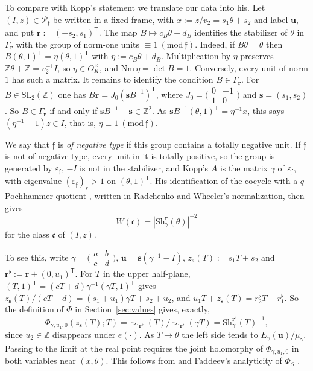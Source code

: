 \documentclass[11pt]{amsart}
\numberwithin{equation}{section}
\theoremstyle{plain}
\theoremstyle{definition}
\theoremstyle{remark}
\begin{document}
To compare with Kopp's statement we translate our data into his. Let $(I,z)\in\mathcal P_{\mathfrak f}$ be written in a fixed frame, with $x:=z/v_2=s_1\theta+s_2$ and label $\mathbf u$, and put $\mathbf r:=(-s_2,s_1)^{\mathsf T}$. The map $B\mapsto c_B\theta+d_B$ identifies the stabilizer of $\theta$ in $\Gamma_{\mathbf r}$ with the group of norm-one units $\equiv1\ (\mathrm{mod}\ \mathfrak f)$. Indeed, if $B\theta=\theta$ then $B(\theta,1)^{\mathsf T}=\eta(\theta,1)^{\mathsf T}$ with $\eta:=c_B\theta+d_B$. Multiplication by $\eta$ preserves $\mathbb Z\theta+\mathbb Z=v_2^{-1}I$, so $\eta\in O_K^\times$, and $\mathrm{Nm}\,\eta=\det B=1$. Conversely, every unit of norm $1$ has such a matrix. It remains to identify the condition $B\in\Gamma_{\mathbf r}$. For $B\in\mathrm{SL}_2(\mathbb Z)$ one has $B\mathbf r=J_0(\mathbf sB^{-1})^{\mathsf T}$, where $J_0=\bigl(\begin{smallmatrix}0&-1\\1&0\end{smallmatrix}\bigr)$ and $\mathbf s=(s_1,s_2)$. So $B\in\Gamma_{\mathbf r}$ if and only if $\mathbf sB^{-1}-\mathbf s\in\mathbb Z^2$. As $\mathbf sB^{-1}(\theta,1)^{\mathsf T}=\eta^{-1}x$, this says $(\eta^{-1}-1)z\in I$, that is, $\eta\equiv1\ (\mathrm{mod}\ \mathfrak f)$.

We say that $\mathfrak f$ is \emph{of negative type} if this group contains a totally negative unit. If $\mathfrak f$ is not of negative type, every unit in it is totally positive, so the group is generated by $\varepsilon_{\mathfrak f}$, $-I$ is not in the stabilizer, and Kopp's $A$ is the matrix $\gamma$ of $\varepsilon_{\mathfrak f}$, with eigenvalue $(\varepsilon_{\mathfrak f})_r>1$ on $(\theta,1)^{\mathsf T}$. His identification of the cocycle with a $q$-Pochhammer quotient \cite[Lemma~4.14, Props.~4.19, 4.35, 4.39]{Ko}, written in Radchenko and Wheeler's normalization, then gives
\begin{equation}\label{eq:koppW}
W(\mathfrak c)=|\mathrm{Sh}^{\mathbf r}_\gamma(\theta)|^{-2}
\end{equation}
for the class $\mathfrak c$ of $(I,z)$.

To see this, write $\gamma=\bigl(\begin{smallmatrix}a&b\\c&d\end{smallmatrix}\bigr)$, $\mathbf u=\mathbf s(\gamma^{-1}-I)$, $z_{\mathbf s}(T):=s_1T+s_2$ and $\mathbf r^\flat:=\mathbf r+(0,u_1)^{\mathsf T}$. For $T$ in the upper half-plane, $(T,1)^{\mathsf T}=(cT+d)\gamma^{-1}(\gamma T,1)^{\mathsf T}$ gives $z_{\mathbf s}(T)/(cT+d)=(s_1+u_1)\gamma T+s_2+u_2$, and $u_1T+z_{\mathbf s}(T)=r^\flat_2T-r^\flat_1$. So the definition of $\Phi$ in Section~\ref{sec:values} gives, exactly,
\[\Phi_{\gamma,u_1,0}(z_{\mathbf s}(T);T)=\varpi_{\mathbf r^\flat}(T)/\varpi_{\mathbf r^\flat}(\gamma T)=\mathrm{Sh}^{\mathbf r^\flat}_\gamma(T)^{-1},\]
since $u_2\in\mathbb Z$ disappears under $e(\cdot)$. As $T\to\theta$ the left side tends to $E_\gamma(\mathbf u)/\mu_\gamma$. Passing to the limit at the real point requires the joint holomorphy of $\Phi_{\gamma,u_1,0}$ in both variables near $(x,\theta)$. This follows from \cite[Prop.~2(i)]{RW} and Faddeev's analyticity of $\Phi_S$ \cite{Fa95}.
\end{document}
